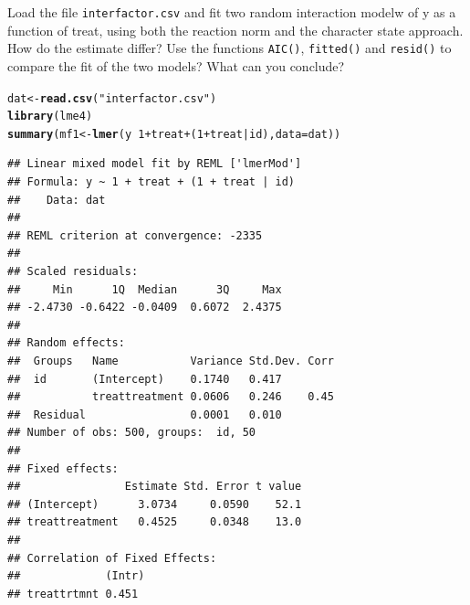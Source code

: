 \documentclass[12pt,a4paper]{scrartcl}\usepackage[]{graphicx}\usepackage[]{color}
\makeatletter
\newcommand{\hlnum}[1]{\textcolor[rgb]{0.686,0.059,0.569}{#1}}%
\newcommand{\hlstr}[1]{\textcolor[rgb]{0.192,0.494,0.8}{#1}}%
\newcommand{\hlopt}[1]{\textcolor[rgb]{0,0,0}{#1}}%
\newcommand{\hlstd}[1]{\textcolor[rgb]{0.345,0.345,0.345}{#1}}%
\newcommand{\hlkwb}[1]{\textcolor[rgb]{0.69,0.353,0.396}{#1}}%
\newcommand{\hlkwc}[1]{\textcolor[rgb]{0.333,0.667,0.333}{#1}}%
\newcommand{\hlkwd}[1]{\textcolor[rgb]{0.737,0.353,0.396}{\textbf{#1}}}%
\newenvironment{kframe}{%
 \def\at@end@of@kframe{}%
 \ifinner\ifhmode%
  \def\at@end@of@kframe{\end{minipage}}%
  \begin{minipage}{\columnwidth}%
 \fi\fi%
 \def\FrameCommand##1{\hskip\@totalleftmargin \hskip-\fboxsep
 \colorbox{shadecolor}{##1}\hskip-\fboxsep
     \hskip-\linewidth \hskip-\@totalleftmargin \hskip\columnwidth}%
 \MakeFramed {\advance\hsize-\width
   \@totalleftmargin\z@ \linewidth\hsize
   \@setminipage}}%
 {\par\unskip\endMakeFramed%
 \at@end@of@kframe}
\newenvironment{knitrout}{}{} %
\makeatother
\begin{document}
\begin{Exercise}[difficulty=1, title={Random interaction with a factor}]
Load the file \texttt{interfactor.csv} and fit two random interaction modelw of y as a function of treat, using both the reaction norm and the character state approach. How do the estimate differ?
Use the functions \texttt{AIC()}, \texttt{fitted()} and \texttt{resid()} to compare the fit of the two models? What can you conclude?
\end{Exercise}
\begin{Answer}
\begin{knitrout}
\color{fgcolor}\begin{kframe}
\begin{alltt}
\hlstd{dat} \hlkwb{<-} \hlkwd{read.csv}\hlstd{(}\hlstr{"interfactor.csv"}\hlstd{)}
\hlkwd{library}\hlstd{(lme4)}
\hlkwd{summary}\hlstd{(mf1} \hlkwb{<-} \hlkwd{lmer}\hlstd{(y} \hlopt{~} \hlnum{1} \hlopt{+} \hlstd{treat} \hlopt{+} \hlstd{(}\hlnum{1}\hlopt{+}\hlstd{treat}\hlopt{|}\hlstd{id),} \hlkwc{data} \hlstd{= dat))}
\end{alltt}
\begin{verbatim}
## Linear mixed model fit by REML ['lmerMod']
## Formula: y ~ 1 + treat + (1 + treat | id)
##    Data: dat
## 
## REML criterion at convergence: -2335
## 
## Scaled residuals: 
##     Min      1Q  Median      3Q     Max 
## -2.4730 -0.6422 -0.0409  0.6072  2.4375 
## 
## Random effects:
##  Groups   Name           Variance Std.Dev. Corr
##  id       (Intercept)    0.1740   0.417        
##           treattreatment 0.0606   0.246    0.45
##  Residual                0.0001   0.010        
## Number of obs: 500, groups:  id, 50
## 
## Fixed effects:
##                Estimate Std. Error t value
## (Intercept)      3.0734     0.0590    52.1
## treattreatment   0.4525     0.0348    13.0
## 
## Correlation of Fixed Effects:
##             (Intr)
## treattrtmnt 0.451
\end{verbatim}
\end{kframe}
\end{knitrout}


\end{Answer}
\end{document}
